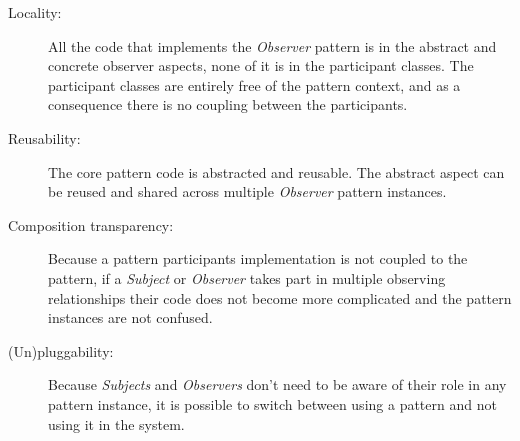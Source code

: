 \begin{description}
	\item [Locality:] All the code that implements the \textit{Observer} pattern is in the abstract and concrete observer aspects, none of it is in the participant classes. 
	The participant classes are entirely free of the pattern context, and as a consequence there is no coupling between the participants.

	\item [Reusability:] The core pattern code is abstracted and reusable. 
	The abstract aspect can be reused and shared across multiple \textit{Observer} pattern instances.

	\item [Composition transparency:] Because a pattern participants implementation is not coupled to the pattern, if a \textit{Subject} or \textit{Observer} takes part in multiple observing relationships their code does not become more complicated and the pattern instances are not confused. 

	\item [(Un)pluggability:] Because \textit{Subjects} and \textit{Observers} don't need to be aware of their role in any pattern instance, it is possible to switch between using a pattern and not using it in the system. 
\end{description}



